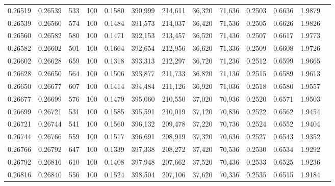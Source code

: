 \begin{tabular}{rrrrrrrrrrrrr}
0.26519 & 0.26539 &   533 & 100 &                                     0.1580 & 390,999 & 214,611 &  36,320 &  71,636 & 0.2503 & 0.6636 & 1.9879 \\
0.26539 & 0.26560 &   574 & 100 &                                     0.1484 & 391,573 & 214,037 &  36,420 &  71,536 & 0.2505 & 0.6626 & 1.9826 \\
0.26560 & 0.26582 &   580 & 100 &                                     0.1471 & 392,153 & 213,457 &  36,520 &  71,436 & 0.2507 & 0.6617 & 1.9773 \\
0.26582 & 0.26602 &   501 & 100 &                                     0.1664 & 392,654 & 212,956 &  36,620 &  71,336 & 0.2509 & 0.6608 & 1.9726 \\
0.26602 & 0.26628 &   659 & 100 &                                     0.1318 & 393,313 & 212,297 &  36,720 &  71,236 & 0.2512 & 0.6599 & 1.9665 \\
0.26628 & 0.26650 &   564 & 100 &                                     0.1506 & 393,877 & 211,733 &  36,820 &  71,136 & 0.2515 & 0.6589 & 1.9613 \\
0.26650 & 0.26677 &   607 & 100 &                                     0.1414 & 394,484 & 211,126 &  36,920 &  71,036 & 0.2518 & 0.6580 & 1.9557 \\
0.26677 & 0.26699 &   576 & 100 &                                     0.1479 & 395,060 & 210,550 &  37,020 &  70,936 & 0.2520 & 0.6571 & 1.9503 \\
0.26699 & 0.26721 &   531 & 100 &                                     0.1585 & 395,591 & 210,019 &  37,120 &  70,836 & 0.2522 & 0.6562 & 1.9454 \\
0.26721 & 0.26744 &   541 & 100 &                                     0.1560 & 396,132 & 209,478 &  37,220 &  70,736 & 0.2524 & 0.6552 & 1.9404 \\
0.26744 & 0.26766 &   559 & 100 &                                     0.1517 & 396,691 & 208,919 &  37,320 &  70,636 & 0.2527 & 0.6543 & 1.9352 \\
0.26766 & 0.26792 &   647 & 100 &                                     0.1339 & 397,338 & 208,272 &  37,420 &  70,536 & 0.2530 & 0.6534 & 1.9292 \\
0.26792 & 0.26816 &   610 & 100 &                                     0.1408 & 397,948 & 207,662 &  37,520 &  70,436 & 0.2533 & 0.6525 & 1.9236 \\
0.26816 & 0.26840 &   556 & 100 &                                     0.1524 & 398,504 & 207,106 &  37,620 &  70,336 & 0.2535 & 0.6515 & 1.9184 \\

\end{tabular}
